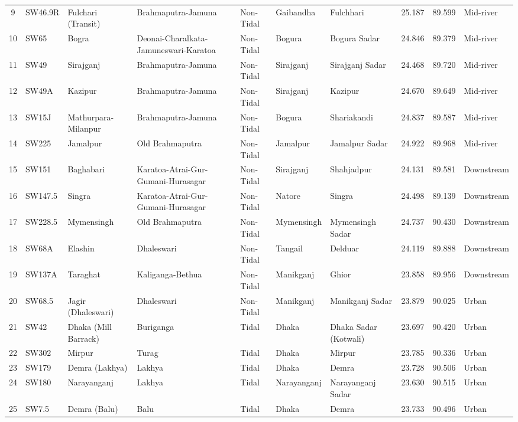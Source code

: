 \begin{landscape}
\begin{table}[htbp]
\begin{tabularx}{\linewidth}{@{}c l X X l X X r r l@{}}
    9 & SW46.9R & Fulchari (Transit) & Brahmaputra-Jamuna & Non-Tidal & Gaibandha & Fulchhari & 25.187 & 89.599 & Mid-river \\
    10 & SW65 & Bogra & Deonai-Charalkata-Jamuneswari-Karatoa & Non-Tidal & Bogura & Bogura Sadar & 24.846 & 89.379 & Mid-river \\
    11 & SW49 & Sirajganj & Brahmaputra-Jamuna & Non-Tidal & Sirajganj & Sirajganj Sadar & 24.468 & 89.720 & Mid-river \\
    12 & SW49A & Kazipur & Brahmaputra-Jamuna & Non-Tidal & Sirajganj & Kazipur & 24.670 & 89.649 & Mid-river \\
    13 & SW15J & Mathurpara-Milanpur & Brahmaputra-Jamuna & Non-Tidal & Bogura & Shariakandi & 24.837 & 89.587 & Mid-river \\
    14 & SW225 & Jamalpur & Old Brahmaputra & Non-Tidal & Jamalpur & Jamalpur Sadar & 24.922 & 89.968 & Mid-river \\
    15 & SW151 & Baghabari & Karatoa-Atrai-Gur-Gumani-Hurasagar & Non-Tidal & Sirajganj & Shahjadpur & 24.131 & 89.581 & Downstream \\
    16 & SW147.5 & Singra & Karatoa-Atrai-Gur-Gumani-Hurasagar & Non-Tidal & Natore & Singra & 24.498 & 89.139 & Downstream \\
    17 & SW228.5 & Mymensingh & Old Brahmaputra & Non-Tidal & Mymensingh & Mymensingh Sadar & 24.737 & 90.430 & Downstream \\
    18 & SW68A & Elashin & Dhaleswari & Non-Tidal & Tangail & Delduar & 24.119 & 89.888 & Downstream \\
    19 & SW137A & Taraghat & Kaliganga-Bethua & Non-Tidal & Manikganj & Ghior & 23.858 & 89.956 & Downstream \\
    20 & SW68.5 & Jagir (Dhaleswari) & Dhaleswari & Non-Tidal & Manikganj & Manikganj Sadar & 23.879 & 90.025 & Urban \\
    21 & SW42 & Dhaka (Mill Barrack) & Buriganga & Tidal & Dhaka & Dhaka Sadar (Kotwali) & 23.697 & 90.420 & Urban \\
    22 & SW302 & Mirpur & Turag & Tidal & Dhaka & Mirpur & 23.785 & 90.336 & Urban \\
    23 & SW179 & Demra (Lakhya) & Lakhya & Tidal & Dhaka & Demra & 23.728 & 90.506 & Urban \\
    24 & SW180 & Narayanganj & Lakhya & Tidal & Narayanganj & Narayanganj Sadar & 23.630 & 90.515 & Urban \\
    25 & SW7.5 & Demra (Balu) & Balu & Tidal & Dhaka & Demra & 23.733 & 90.496 & Urban \\
    \bottomrule
  \end{tabularx}
\end{table}
\end{landscape}

